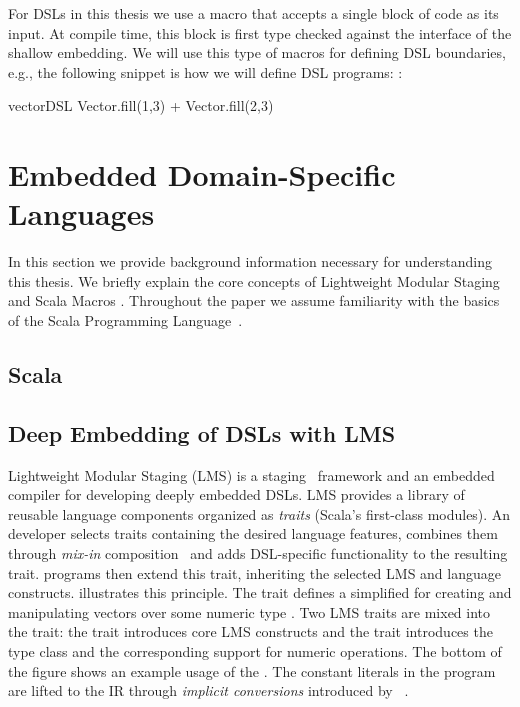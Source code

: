 For DSLs in this thesis we use a macro that accepts a single block of
 code as its input. At compile time, this block is first type checked
 against the interface of the shallow embedding.  We will use this type of macros
 for defining DSL boundaries, e.g., the following snippet is how we will define DSL
 programs:
:\begin{lstparagraph}
vectorDSL {
  Vector.fill(1,3) + Vector.fill(2,3)
}
\end{lstparagraph}


\section{Embedded Domain-Specific Languages}
\label{sec:embedded-domain-specific-languages}

In this section we provide background information necessary for understanding this
thesis. We briefly explain the core concepts of Lightweight Modular Staging
\cite{rompf2012lightweight,rompf_optimizing_2013} and Scala Macros
\cite{burmako_scala_2013}. Throughout the paper we assume familiarity with
the basics of the Scala Programming Language~\cite{odersky_scala_2004}.
\subsection{Scala}
\subsection{Deep Embedding of DSLs with LMS}
\label{subsec:deep-embedding}

Lightweight Modular Staging (LMS) is a
staging~\cite{taha_multi-stage_1997} framework and an embedded
compiler for developing deeply embedded DSLs.  LMS provides a library
of reusable language components organized as \emph{traits} (Scala's
first-class modules).  An \edsl developer selects traits containing
the desired language features, combines them through \emph{mix-in}
composition~\cite{odersky_scalable_2005} and adds DSL-specific
functionality to the resulting \edsl trait.  \edsl programs then
extend this trait, inheriting the selected LMS and \edsl language
constructs.  illustrates this principle.  The trait
 defines a simplified \edsl for creating and
manipulating vectors over some numeric type .  Two LMS traits
are mixed into the  trait: the  trait
introduces core LMS constructs %
and the  trait introduces the  type
class and the corresponding support for numeric operations.  The
bottom of the figure shows an example usage of the \edsl. The constant
literals in the program are lifted to the IR through \emph{implicit
  conversions} introduced by ~\cite{oliveira_type_2010}.

